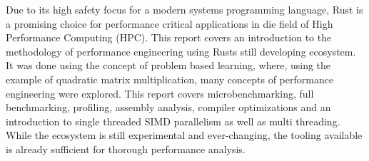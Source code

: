 Due to its high safety focus for a modern systems programming language, Rust is a promising choice for performance critical applications in die field of High Performance Computing (HPC). This report covers an introduction to the methodology of performance engineering using Rusts still developing ecosystem. It was done using the concept of problem based learning, where, using the example of quadratic matrix multiplication, many concepts of performance engineering were explored. This report covers microbenchmarking, full benchmarking, profiling, assembly analysis, compiler optimizations and an introduction to single threaded SIMD parallelism as well as multi threading. While the ecosystem is still experimental and ever-changing, the tooling available is already sufficient for thorough performance analysis.
